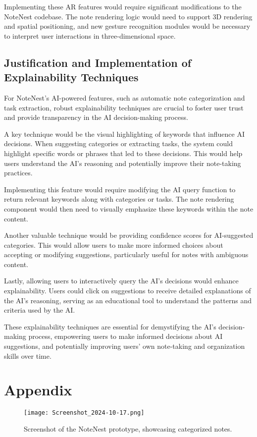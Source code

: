 \documentclass[a4paper, 12pt]{article}
\begin{document}
Implementing these AR features would require significant modifications to the NoteNest codebase. The note rendering logic would need to support 3D rendering and spatial positioning, and new gesture recognition modules would be necessary to interpret user interactions in three-dimensional space.

\subsection{Justification and Implementation of Explainability Techniques}

For NoteNest's AI-powered features, such as automatic note categorization and task extraction, robust explainability techniques are crucial to foster user trust and provide transparency in the AI decision-making process.

A key technique would be the visual highlighting of keywords that influence AI decisions. When suggesting categories or extracting tasks, the system could highlight specific words or phrases that led to these decisions. This would help users understand the AI's reasoning and potentially improve their note-taking practices.

Implementing this feature would require modifying the AI query function to return relevant keywords along with categories or tasks. The note rendering component would then need to visually emphasize these keywords within the note content.

Another valuable technique would be providing confidence scores for AI-suggested categories. This would allow users to make more informed choices about accepting or modifying suggestions, particularly useful for notes with ambiguous content.

Lastly, allowing users to interactively query the AI's decisions would enhance explainability. Users could click on suggestions to receive detailed explanations of the AI's reasoning, serving as an educational tool to understand the patterns and criteria used by the AI.

These explainability techniques are essential for demystifying the AI's decision-making process, empowering users to make informed decisions about AI suggestions, and potentially improving users' own note-taking and organization skills over time.

\newpage

\section*{Appendix}
\begin{figure}[H]
    \centering
    \texttt{[image: Screenshot\_2024-10-17.png]}
    \caption{Screenshot of the NoteNest prototype, showcasing categorized notes.}
\end{figure}
\end{document}
